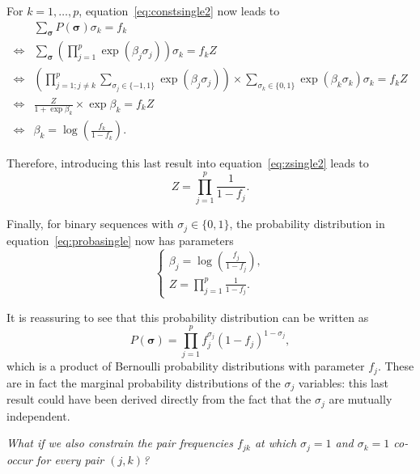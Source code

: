 \documentclass[12pt]{article}
\begin{document}
  For $k = 1, \dots, p$, equation~\eqref{eq:constsingle2} now leads to
  \begin{equation}
    \begin{split}
      &\sum_{\bm{\sigma}} P(\bm{\sigma}) \sigma_k = f_k\\
      \iff& \sum_{\bm{\sigma}} \left(\prod_{j = 1}^p\exp(\beta_j
        \sigma_j)\right) \sigma_k = f_k Z\\
      \iff& \left(\prod_{j = 1; j\neq k}^p \sum_{\sigma_j\in\{-1, 1\}}
        \exp(\beta_j \sigma_j)\right) \times \sum_{\sigma_k\in\{0, 1\}}
        \exp(\beta_k \sigma_k) \sigma_k = f_k Z\\
      \iff& \frac{Z}{1 + \exp\beta_k} \times \exp\beta_k = f_k Z\\
      \iff& \beta_k = \log\left(\frac{f_k}{1 - f_k}\right).
    \end{split}
  \end{equation}

  Therefore, introducing this last result into equation~\eqref{eq:zsingle2}
  leads to
  \begin{equation}
    Z = \prod_{j = 1}^p \frac{1}{1 - f_j}.
  \end{equation}

  Finally, for binary sequences with $\sigma_j\in\{0, 1\}$, the probability
  distribution in equation~\eqref{eq:probasingle} now has parameters
  \begin{equation}
    \begin{cases}
      \beta_j = \log\left(\displaystyle\frac{f_j}{1 - f_j}\right),\\[1em]
      Z = \displaystyle\prod_{j = 1}^p \frac{1}{1 - f_j}.
    \end{cases}
  \end{equation}

  It is reassuring to see that this probability distribution can be written as
  \begin{equation}
    P(\bm{\sigma}) = \prod_{j = 1}^p f_j^{\sigma_j} {(1 - f_j)}^{1 -
      \sigma_j},
  \end{equation}
  which is a product of Bernoulli probability distributions with parameter
  $f_j$. These are in fact the marginal probability distributions of the
  $\sigma_j$ variables: this last result could have been derived directly from
  the fact that the $\sigma_j$ are mutually independent.

  \begin{displayquote}
    \itshape{}
    What if we also constrain the pair frequencies $f_{jk}$ at which $\sigma_j
    = 1$ and $\sigma_k = 1$ co-occur for every pair $(j, k)$?
  \end{displayquote}
\end{document}
